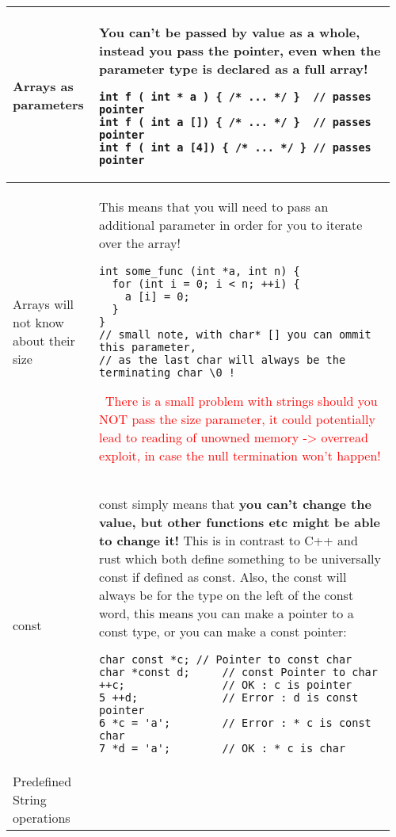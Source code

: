 \documentclass[main.tex,fontsize=8pt,paper=a4,paper=portrait,DIV=calc,]{scrartcl}
\begin{document}
\begin{table}[ht!]
\begin{tabular}{|m{0.2\linewidth}|m{0.755\linewidth}|}
\hline
Arrays as parameters & 
You can't be passed by value as a whole, instead you pass the pointer, \textbf{even when the parameter type is declared as a full array!}\newline
\begin{lstlisting}
int f ( int * a ) { /* ... */ }  // passes pointer
int f ( int a []) { /* ... */ }  // passes pointer
int f ( int a [4]) { /* ... */ } // passes pointer
\end{lstlisting}\\
\hline
Arrays will not know about their size & 
This means that you will need to pass an additional parameter in order for you to iterate over the array!\newline
\begin{lstlisting}
int some_func (int *a, int n) {
  for (int i = 0; i < n; ++i) {
    a [i] = 0;
  }
}
// small note, with char* [] you can ommit this parameter,
// as the last char will always be the terminating char \0 !
\end{lstlisting}
\, \newline
\textcolor{red}{There is a small problem with strings should you NOT pass the size parameter, it could potentially lead to reading of unowned memory -> overread exploit,\newline
in case the null termination won't happen!}\\
\hline
const & 
const simply means that \textbf{you can't change the value, but other functions etc might be able to change it!}\newline
This is in contrast to C++ and rust which both define something to be universally const if defined as const.\newline
\textcolor{OliveGreen}{Also, the const will always be for the type on the left of the const word, this means you can make a pointer to a const type,\newline
or you can make a const pointer:}\newline
\begin{lstlisting}
char const *c; // Pointer to const char
char *const d;     // const Pointer to char
++c;               // OK : c is pointer
5 ++d;             // Error : d is const pointer
6 *c = 'a';        // Error : * c is const char
7 *d = 'a';        // OK : * c is char
\end{lstlisting}\\
\hline
Predefined String operations &

\end{tabular}
\end{table}
\end{document}
